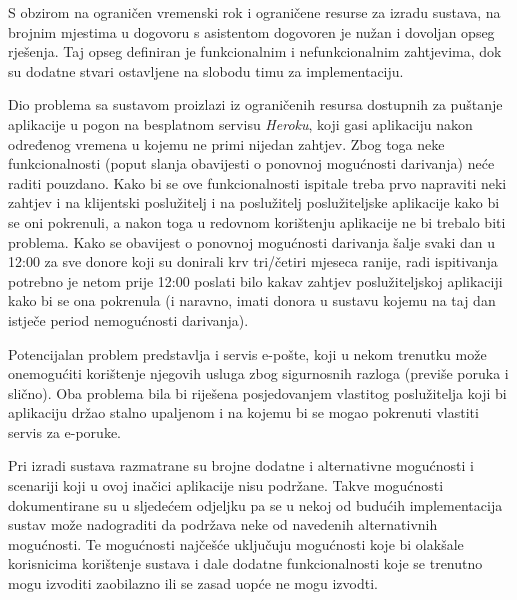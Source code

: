             \par{
            S obzirom na ograničen vremenski rok i ograničene resurse za izradu sustava, na brojnim mjestima u dogovoru s asistentom dogovoren je nužan i dovoljan opseg rješenja. Taj opseg definiran je funkcionalnim i nefunkcionalnim zahtjevima, dok su dodatne stvari ostavljene na slobodu timu za implementaciju.
            }
            \par{
            Dio problema sa sustavom proizlazi iz ograničenih resursa dostupnih za puštanje aplikacije u pogon na besplatnom servisu \textit{Heroku}, koji gasi aplikaciju nakon određenog vremena u kojemu ne primi nijedan zahtjev. Zbog toga neke funkcionalnosti (poput slanja obavijesti o ponovnoj mogućnosti darivanja) neće raditi pouzdano. Kako bi se ove funkcionalnosti ispitale treba prvo napraviti neki zahtjev i na klijentski poslužitelj i na poslužitelj poslužiteljske aplikacije kako bi se oni pokrenuli, a nakon toga u redovnom korištenju aplikacije ne bi trebalo biti problema. Kako se obavijest o ponovnoj mogućnosti darivanja šalje svaki dan u 12:00 za sve donore koji su donirali krv tri/četiri mjeseca ranije, radi ispitivanja potrebno je netom prije 12:00 poslati bilo kakav zahtjev poslužiteljskoj aplikaciji kako bi se ona pokrenula (i naravno, imati donora u sustavu kojemu na taj dan istječe period nemogućnosti darivanja).
            }
            \par{
            Potencijalan problem predstavlja i servis e-pošte, koji u nekom trenutku može onemogućiti korištenje njegovih usluga zbog sigurnosnih razloga (previše poruka i slično). Oba problema bila bi riješena posjedovanjem vlastitog poslužitelja koji bi aplikaciju držao stalno upaljenom i na kojemu bi se mogao pokrenuti vlastiti servis za e-poruke.
            }
            \par{
            Pri izradi sustava razmatrane su brojne dodatne i alternativne mogućnosti i scenariji koji u ovoj inačici aplikacije nisu podržane. Takve mogućnosti dokumentirane su u sljedećem odjeljku pa se u nekoj od budućih implementacija sustav može nadograditi da podržava neke od navedenih alternativnih mogućnosti. Te mogućnosti najčešće uključuju mogućnosti koje bi olakšale korisnicima korištenje sustava i dale dodatne funkcionalnosti koje se trenutno mogu izvoditi zaobilazno ili se zasad uopće ne mogu izvodti.
            }
        
